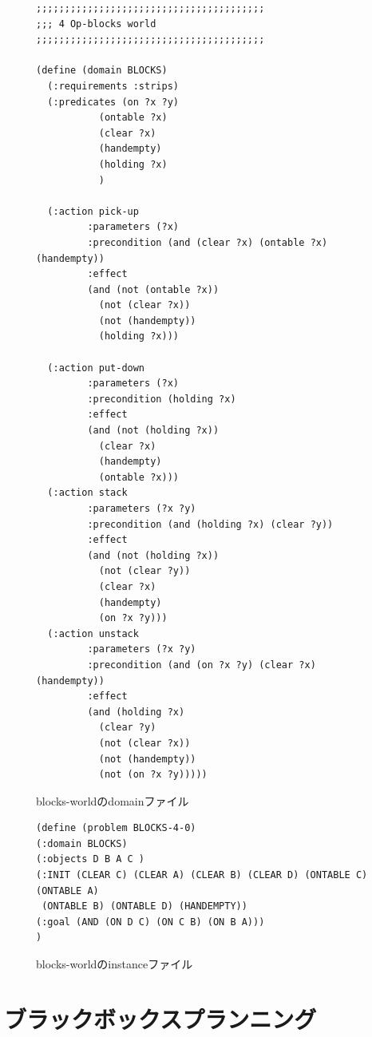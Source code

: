 \documentclass{report}
\begin{document}
\begin{figure}
\begin{adjustbox}{width=\textwidth,keepaspectratio}
\lstset{language=pddl}
\begin{lstlisting}
;;;;;;;;;;;;;;;;;;;;;;;;;;;;;;;;;;;;;;;;
;;; 4 Op-blocks world
;;;;;;;;;;;;;;;;;;;;;;;;;;;;;;;;;;;;;;;;

(define (domain BLOCKS)
  (:requirements :strips)
  (:predicates (on ?x ?y)
	       (ontable ?x)
	       (clear ?x)
	       (handempty)
	       (holding ?x)
	       )

  (:action pick-up
	     :parameters (?x)
	     :precondition (and (clear ?x) (ontable ?x) (handempty))
	     :effect
	     (and (not (ontable ?x))
		   (not (clear ?x))
		   (not (handempty))
		   (holding ?x)))

  (:action put-down
	     :parameters (?x)
	     :precondition (holding ?x)
	     :effect
	     (and (not (holding ?x))
		   (clear ?x)
		   (handempty)
		   (ontable ?x)))
  (:action stack
	     :parameters (?x ?y)
	     :precondition (and (holding ?x) (clear ?y))
	     :effect
	     (and (not (holding ?x))
		   (not (clear ?y))
		   (clear ?x)
		   (handempty)
		   (on ?x ?y)))
  (:action unstack
	     :parameters (?x ?y)
	     :precondition (and (on ?x ?y) (clear ?x) (handempty))
	     :effect
	     (and (holding ?x)
		   (clear ?y)
		   (not (clear ?x))
		   (not (handempty))
		   (not (on ?x ?y)))))
\end{lstlisting}
\end{adjustbox}
\caption{blocks-worldのdomainファイル}
\label{fig:pddl-domain}
\end{figure}

\begin{figure}
\begin{adjustbox}{width=\textwidth,keepaspectratio}
\lstset{language=pddl}
\begin{lstlisting}
(define (problem BLOCKS-4-0)
(:domain BLOCKS)
(:objects D B A C )
(:INIT (CLEAR C) (CLEAR A) (CLEAR B) (CLEAR D) (ONTABLE C) (ONTABLE A)
 (ONTABLE B) (ONTABLE D) (HANDEMPTY))
(:goal (AND (ON D C) (ON C B) (ON B A)))
)

\end{lstlisting}
\end{adjustbox}
\caption{blocks-worldのinstanceファイル}
\label{fig:pddl-instance}
\end{figure}

\section{ブラックボックスプランニング}
\end{document}
